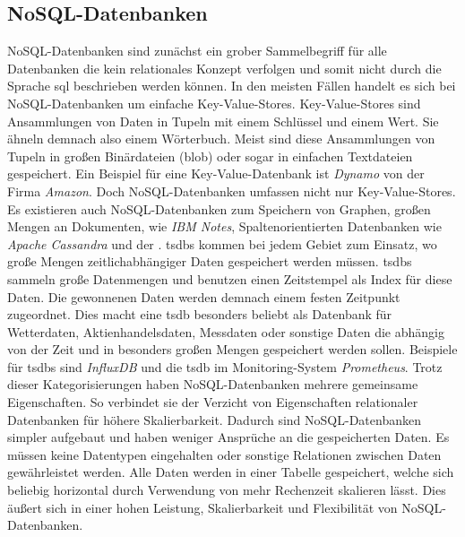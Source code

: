 \documentclass[titlepage]{report}
\begin{document}
\subsection*{NoSQL\hyp{}Datenbanken}
NoSQL\hyp{}Datenbanken sind zunächst ein grober Sammelbegriff für alle
Datenbanken die kein relationales Konzept verfolgen und somit nicht
durch die Sprache \gls{sql} beschrieben werden können. In den meisten
Fällen handelt es sich bei NoSQL\hyp{}Datenbanken um einfache
Key\hyp{}Value\hyp{}Stores. Key\hyp{}Value\hyp{}Stores sind Ansammlungen
von Daten in Tupeln mit einem Schlüssel und einem Wert. Sie ähneln
demnach also einem Wörterbuch.  Meist sind diese Ansammlungen von Tupeln
in großen Binärdateien (\gls{blob}) oder sogar in einfachen Textdateien
gespeichert. Ein Beispiel für eine Key\hyp{}Value\hyp{}Datenbank ist
\emph{Dynamo} von der Firma \emph{Amazon}. Doch NoSQL\hyp{}Datenbanken
umfassen nicht nur Key\hyp{}Value\hyp{}Stores. Es existieren auch
NoSQL\hyp{}Datenbanken zum Speichern von Graphen, großen Mengen an
Dokumenten, wie \emph{IBM Notes}, Spaltenorientierten Datenbanken wie
\emph{Apache Cassandra} und der . \glspl{tsdb} kommen bei
jedem Gebiet zum Einsatz, wo große Mengen zeitlichabhängiger Daten
gespeichert werden müssen. \glspl{tsdb} sammeln große Datenmengen und
benutzen einen Zeitstempel als Index für diese Daten. Die gewonnenen
Daten werden demnach einem festen Zeitpunkt zugeordnet. Dies macht eine
\gls{tsdb} besonders beliebt als Datenbank für Wetterdaten,
Aktienhandelsdaten, Messdaten oder sonstige Daten die abhängig von der
Zeit und in besonders großen Mengen gespeichert werden sollen. Beispiele
für \glspl{tsdb} sind \emph{InfluxDB} und die \gls{tsdb} im
Monitoring-System \emph{Prometheus}. Trotz dieser Kategorisierungen
haben NoSQL\hyp{}Datenbanken mehrere gemeinsame Eigenschaften. So
verbindet sie der Verzicht von Eigenschaften relationaler Datenbanken
für höhere Skalierbarkeit\cite[S. 13]{TSDB}. Dadurch sind
NoSQL\hyp{}Datenbanken simpler aufgebaut und haben weniger Ansprüche an
die gespeicherten Daten. Es müssen keine Datentypen eingehalten oder
sonstige Relationen zwischen Daten gewährleistet werden. Alle Daten
werden in einer Tabelle gespeichert, welche sich beliebig horizontal
durch Verwendung von mehr Rechenzeit skalieren lässt. Dies äußert sich
in einer hohen Leistung, Skalierbarkeit und Flexibilität von
NoSQL\hyp{}Datenbanken\cite{NOSQL}.
\end{document}
